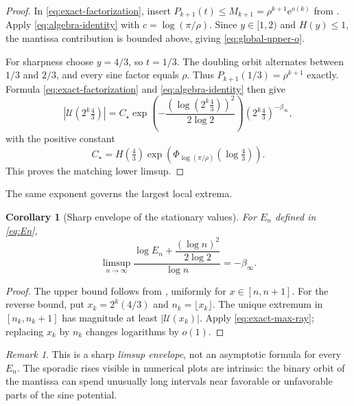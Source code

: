 \documentclass[11pt,oneside]{article}
\newtheorem{corollary}[theorem]{Corollary}
\theoremstyle{definition}
\theoremstyle{remark}
\newtheorem{remark}[theorem]{Remark}
\newcommand{\e}{\mathrm e}
\newcommand{\Uhat}{\mathcal U}
\begin{document}
\begin{proof}
In \eqref{eq:exact-factorization}, insert
$P_{k+1}(t)\le M_{k+1}=\rho^{k+1}\e^{o(k)}$ from
.  Apply \eqref{eq:algebra-identity} with
$c=\log(\pi/\rho)$.  Since $y\in[1,2)$ and $H(y)\le1$, the mantissa contribution is
bounded above, giving \eqref{eq:global-upper-o}.

For sharpness choose $y=4/3$, so $t=1/3$.  The doubling orbit alternates between
$1/3$ and $2/3$, and every sine factor equals $\rho$.  Thus
$P_{k+1}(1/3)=\rho^{k+1}$ exactly.  Formula \eqref{eq:exact-factorization} and
\eqref{eq:algebra-identity} then give
\begin{equation}\label{eq:exact-max-ray}
 |\Uhat(2^k\tfrac43)|
 =C_\star
 \exp\!\left(-\frac{(\log(2^k\tfrac43))^2}{2\log2}\right)
 (2^k\tfrac43)^{-\beta_\infty},
\end{equation}
with the positive constant
\[
 C_\star=H(\tfrac43)
 \exp\!\left(
 \Phi_{\log(\pi/\rho)}(\log\tfrac43)
 \right).
\]
This proves the matching lower limsup.
\end{proof}

The same exponent governs the largest local extrema.

\begin{corollary}[Sharp envelope of the stationary values]\label{cor:extrema-envelope}
For $E_n$ defined in \eqref{eq:En},
\begin{equation}\label{eq:En-limsup}
 \limsup_{n\to\infty}
 \frac{
 \log E_n+\dfrac{(\log n)^2}{2\log2}}
 {\log n}
 =-\beta_\infty.
\end{equation}
\end{corollary}

\begin{proof}
The upper bound follows from , uniformly for $x\in[n,n+1]$.
For the reverse bound, put $x_k=2^k(4/3)$ and $n_k=\lfloor x_k\rfloor$.  The unique
extremum in $[n_k,n_k+1]$ has magnitude at least $|\Uhat(x_k)|$.  Apply
\eqref{eq:exact-max-ray}; replacing $x_k$ by $n_k$ changes logarithms by $o(1)$.
\end{proof}

\begin{remark}
This is a sharp \emph{limsup envelope}, not an asymptotic formula for every $E_n$.
The sporadic rises visible in numerical plots are intrinsic: the binary orbit of the
mantissa can spend unusually long intervals near favorable or unfavorable parts of the
sine potential.
\end{remark}
\end{document}
